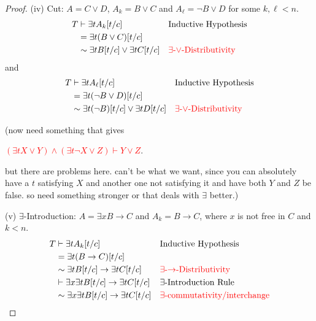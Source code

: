 \documentclass[12pt]{article}
\theoremstyle{definition}
\newcommand{\<}{\langle}
\renewcommand{\>}{\rangle}
\begin{document}
\begin{proof}
    (iv) Cut: $A = C \lor D$, $A_k = B \lor C$ and $A_\ell = \lnot B \lor D$ for some $k, \ell < n$.
    \begin{align*}
        T
            &\vdash \exists{t}A_k[t/c]
                &&\text{Inductive Hypothesis}\\
            &= \exists{t}(B \lor C)[t/c] \\
            &\sim \exists{t}B[t/c] \lor \exists{t}C[t/c]
                &&\text{\textcolor{red}{$\exists$-$\lor$-Distributivity}}
    \end{align*}
    and
    \begin{align*}
        T
            &\vdash \exists{t}A_\ell[t/c]
                &&\text{Inductive Hypothesis}\\
            &= \exists{t}(\lnot B \lor D)[t/c] \\
            &\sim \exists{t}(\lnot B)[t/c] \lor \exists{t}D[t/c]
                &&\text{\textcolor{red}{$\exists$-$\lor$-Distributivity}}
    \end{align*}

    (now need something that gives
    
    \textcolor{red}{$(\exists{t}X \lor Y) \land (\exists{t} \lnot X \lor Z) \vdash Y \lor Z$}.

    but there are problems here.
    can't be what we want, since you can absolutely have a $t$ satisfying $X$ and another one not satisfying it and have both $Y$ and $Z$ be false.
    so need something stronger or that deals with $\exists$ better.)

    (v) $\exists$-Introduction: $A = \exists{x}B \to C$ and $A_k = B \to C$, where $x$ is not free in $C$ and $k < n$.
    \begin{align*}
        T
            &\vdash \exists{t}A_k[t/c]
                &&\text{Inductive Hypothesis}\\
            &= \exists{t}(B \to C)[t/c] \\
            &\sim \exists{t}B[t/c] \to \exists{t}C[t/c]
                &&\text{\textcolor{red}{$\exists$-$\to$-Distributivity}} \\
            &\vdash \exists{x}\exists{t}B[t/c] \to \exists{t}C[t/c]
                &&\text{$\exists$-Introduction Rule} \\
            &\sim \exists{x}\exists{t}B[t/c] \to \exists{t}C[t/c]
                &&\text{\textcolor{red}{$\exists$-commutativity/interchange}} \\
    \end{align*}


\end{proof}
\end{document}
